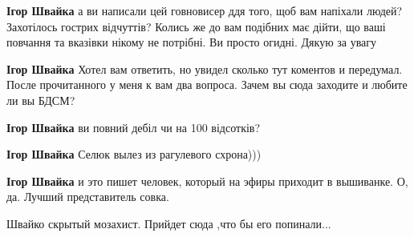 \begin{itemize}
\begin{itemize}
\textbf{Ігор Швайка} а ви написали цей говновисер ддя того, щоб вам напіхали
людей? Захотілось гострих відчуттів? Колись же до вам подібних має дійти, що
ваші повчання та вказівки нікому не потрібні. Ви просто огидні. Дякую за увагу

 
\textbf{Ігор Швайка} Хотел вам ответить, но увидел сколько тут коментов и передумал. После прочитанного у меня к вам два вопроса. Зачем вы сюда заходите и любите ли вы БДСМ?

 
\textbf{Ігор Швайка} ви повний дебіл чи на 100 відсотків?

 
\textbf{Ігор Швайка}
Селюк вылез из рагулевого схрона)))

 
\textbf{Ігор Швайка} и это пишет человек, который на эфиры приходит в вышиванке. О, да. Лучший представитель совка.

 
Швайко скрытый мозахист. Прийдет сюда ,что бы его попинали...

 

\end{itemize}
\end{itemize}
